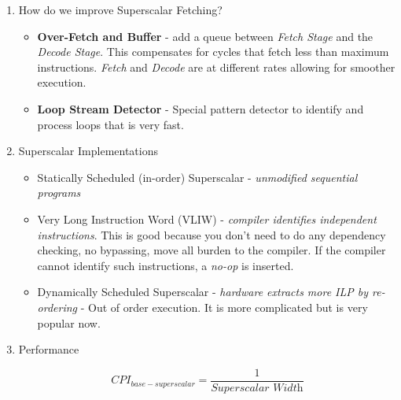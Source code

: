 \documentclass[12pt]{article}
\newenvironment{QandA}{\begin{enumerate}[label=\bfseries\arabic*.]\bfseries}
                      {\end{enumerate}}
\newenvironment{answered}{\par\quad\normalfont}{}
\begin{document}
\begin{QandA}
\begin{answered}
\quad From $(N+1)$ inputs it is now $(\frac{N}{K}+1)$. Instead of $N^{2}$ bypass paths, it is now $(\frac{N}{K})^{2}$ bypass paths. 

\ 

\textit{Q: What about Register Files?}

\quad We can replicate a register file per cluster. This causes some additional complexity since there are now two copies in each register. But we can design the system such that \textit{register writes} update all the replicas. Ideally, we design systems with \textit{more read ports} than \textit{write ports} and this allows us to cut down on \textit{read ports} by reducing the number of read ports from $2N$ to $\frac{2 \times N}{K}$.

\end{answered}

\newpage 

\item How do we improve Superscalar Fetching?
\begin{answered}
\vspace{-0.85cm}
\begin{itemize}
    \item \textbf{Over-Fetch and Buffer} - add a queue between \textit{Fetch Stage} and the \textit{Decode Stage}. This compensates for cycles that fetch less than maximum instructions. \textit{Fetch} and \textit{Decode} are at different rates allowing for smoother execution.
    \item \textbf{Loop Stream Detector} - Special pattern detector to identify and process loops that is very fast.
\end{itemize}
\end{answered}

\item Superscalar Implementations
\begin{answered}
\vspace{-0.85cm}
\begin{itemize}
    \item Statically Scheduled (in-order) Superscalar - \textit{unmodified sequential programs}
    \item Very Long Instruction Word (VLIW) - \textit{compiler identifies independent instructions}. This is good because you don't need to do any dependency checking, no bypassing, move all burden to the compiler. If the compiler cannot identify such instructions, a \textit{no-op} is inserted.
    \item Dynamically Scheduled Superscalar - \textit{hardware extracts more ILP by re-ordering} - Out of order execution. It is more complicated but is very popular now. 
\end{itemize}
\end{answered}

\item Performance
\begin{answered}
\begin{equation*}
    CPI_{base-superscalar} = \frac{1}{\textit{Superscalar Width}}
\end{equation*}
\end{answered}

\end{QandA}
\end{document}
